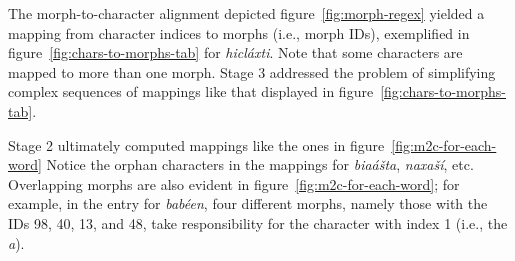 The morph-to-character alignment depicted figure~\ref{fig:morph-regex} yielded
a mapping from character indices to morphs (i.e., morph IDs), exemplified in 
figure~\ref{fig:chars-to-morphs-tab} for \textit{hicl\'{a}xti}. Note that some characters are mapped to more than one morph. 
Stage 3 addressed the problem of simplifying complex sequences of mappings like that displayed in figure~\ref{fig:chars-to-morphs-tab}.





Stage 2 ultimately computed mappings like the ones in figure~\ref{fig:m2c-for-each-word} 
Notice the orphan characters in the mappings for \textit{bia\'a\v{s}ta}, \textit{naxa\v{s}\'{i}}, etc. Overlapping morphs are also evident in figure~\ref{fig:m2c-for-each-word}; for example, in the entry for \textit{bab\'{e}en}, four different morphs, namely those with the IDs 98, 40, 13, and 48, take responsibility for the character with index 1 (i.e., the \textit{a}).

